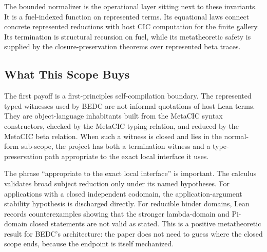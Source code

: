 The bounded normalizer is the operational layer sitting next to these
invariants.  It is a fuel-indexed function on represented terms.  Its
equational laws connect concrete represented reductions with host CIC
computation for the finite gallery.  Its termination is structural recursion
on fuel, while its metatheoretic safety is supplied by the closure-preservation
theorems over represented beta traces.


\subsection{What This Scope Buys}
\label{subsec:closed-term-scope-buys}

The first payoff is a first-principles self-compilation boundary.  The
represented typed witnesses used by BEDC are not informal quotations of host
Lean terms.  They are object-language inhabitants built from the MetaCIC
syntax constructors, checked by the MetaCIC typing relation, and reduced by
the MetaCIC beta relation.  When such a witness is closed and lies in the
normal-form sub-scope, the project has both a termination witness and a
type-preservation path appropriate to the exact local interface it uses.

The phrase ``appropriate to the exact local interface'' is important.  The
calculus validates broad subject reduction only under its named hypotheses.
For applications with a closed independent codomain, the application-argument
stability hypothesis is discharged directly.  For reducible binder domains,
Lean records counterexamples showing that the stronger lambda-domain and
Pi-domain closed statements are not valid as stated.  This is a positive
metatheoretic result for BEDC's architecture: the paper does not need to guess
where the closed scope ends, because the endpoint is itself mechanized.


